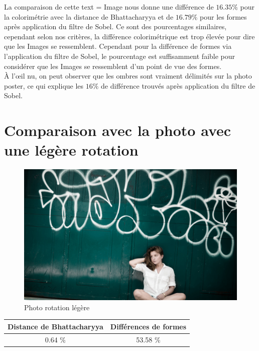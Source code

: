\documentclass[]{article}
\begin{document}
La comparaison de cette text = Image nous donne une différence de $16.35 \%$
pour la colorimétrie avec la distance de Bhattacharyya et de $16.79 \%$
pour les formes après application du filtre de Sobel. Ce sont des
pourcentages similaires, cependant selon nos critères, la différence
colorimétrique est trop élevée pour dire que les Images se ressemblent.
Cependant pour la différence de formes via l'application du filtre de
Sobel, le pourcentage est suffisamment faible pour considérer que les
Images se ressemblent d'un point de vue des formes. \\
À l'\oe il nu, on peut observer que les ombres sont vraiment délimités sur la
photo poster, ce qui explique les $16 \%$ de différence trouvés après
application du filtre de Sobel.

\newpage

\section{Comparaison avec la photo avec une légère
rotation}\label{comparaison-avec-la-photo-avec-une-luxe9guxe8re-rotation}

\begin{figure}[htbp]
\centering
\includegraphics{photos/rotate.jpg}
\caption{Photo rotation légère}
\end{figure}

\begin{center}
\begin{tabular}{|c|c|}
  \hline
  Distance de Bhattacharyya & Différences de formes \\
  \hline
  0.64 \% & 53.58 \% \\
  \hline
\end{tabular}
\end{center}
\end{document}
